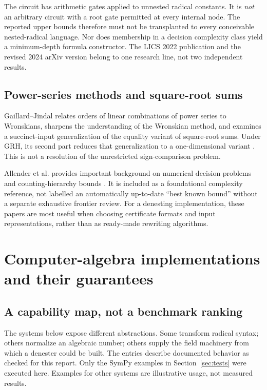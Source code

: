 \documentclass[11pt,a4paper]{article}
\numberwithin{equation}{section}
\theoremstyle{definition}\newtheorem{definition}[theorem]{Definition}
\theoremstyle{remark}\newtheorem{remark}[theorem]{Remark}
\begin{document}
The circuit has arithmetic gates applied to unnested radical constants. It is \emph{not} an arbitrary circuit with a root gate permitted at every internal node. The reported upper bounds therefore must not be transplanted to every conceivable nested-radical language. Nor does membership in a decision complexity class yield a minimum-depth formula constructor. The LICS 2022 publication and the revised 2024 arXiv version belong to one research line, not two independent results.

\subsection{Power-series methods and square-root sums}
Gaillard--Jindal relates orders of linear combinations of power series to Wronskians, sharpens the understanding of the Wronskian method, and examines a succinct-input generalization of the equality variant of square-root sums. Under GRH, its second part reduces that generalization to a one-dimensional variant \cite{gaillard}. This is not a resolution of the unrestricted sign-comparison problem.

Allender et al. provides important background on numerical decision problems and counting-hierarchy bounds \cite{allender}. It is included as a foundational complexity reference, not labelled an automatically up-to-date ``best known bound'' without a separate exhaustive frontier review. For a denesting implementation, these papers are most useful when choosing certificate formats and input representations, rather than as ready-made rewriting algorithms.

\section{Computer-algebra implementations and their guarantees}
\label{sec:cas}

\subsection{A capability map, not a benchmark ranking}
The systems below expose different abstractions. Some transform radical syntax; others normalize an algebraic number; others supply the field machinery from which a denester could be built. The entries describe documented behavior as checked for this report. Only the SymPy examples in Section~\ref{sec:tests} were executed here. Examples for other systems are illustrative usage, not measured results.
\end{document}
